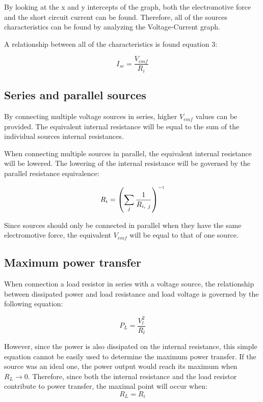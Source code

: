\documentclass[a4paper]{article}
\newcommand{\inv}{^{\raisebox{.2ex}{$\scriptscriptstyle-1$}}}
\begin{document}
By looking at the x and y intercepts of the graph, both the electromotive force
and the short circuit current can be found. Therefore, all of the sources
characteristics can be found by analyzing the Voltage-Current graph.

A relationship between all of the characteristics is found equation 3\cite{lab}:

\begin{equation}
    I_{sc} = \frac{V_{emf}}{R_i}
\end{equation}

\subsection{Series and parallel sources}
By connecting multiple voltage sources in series, higher $V_{emf}$ values can be
provided. The equivalent internal resistance will be equal to the sum of the
individual sources internal resistances.

When connecting multiple sources in parallel, the equivalent internal resistance
will be lowered. The lowering of the internal resistance will be governed by the
parallel resistance equivalence\cite{alexander2017}:

\begin{equation}
    R_i = \left( \sum_{j} \frac{1}{R_{i,~j}}\right) \inv
\end{equation}

Since sources should only be connected in parallel when they have the same
electromotive force, the equivalent $V_{emf}$ will be equal to that of one
source\cite{lab}.

\subsection{Maximum power transfer}

When connection a load resistor in series with a voltage source, the
relationship between dissipated power and load resistance and load voltage is
governed by the following equation:

\begin{equation}
    P_L = \frac{V_l ^2}{R_l}
\end{equation}

However, since the power is also dissipated on the internal resistance, this
simple equation cannot be easily used to determine the maximum power transfer. If the
source was an ideal one, the power output would reach its maximum when $R_L \rightarrow
0$. Therefore, since both the internal resistance and the load resistor
contribute to power transfer, the maximal point will occur when:
\begin{equation}
    R_L = R_i
\end{equation}
\end{document}
